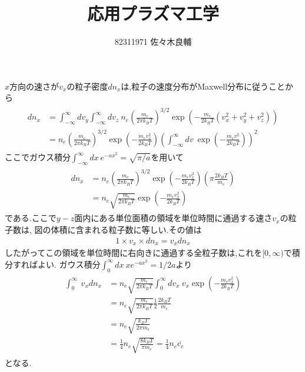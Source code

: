 \documentclass[uplatex,a4j,11pt,dvipdfmx]{jsarticle}
\begin{document}
\title{応用プラズマ工学}
\author{82311971 佐々木良輔}
\date{}
\maketitle
$x$方向の速さが$v_x$の粒子密度$dn_x$は,粒子の速度分布がMaxwell分布に従うことから
\begin{align}
  \begin{split}
    dn_x&=\int_{-\infty}^{\infty}dv_y\int_{-\infty}^{\infty}dv_z\ n_e\left(\frac{m_e}{2\pi k_BT}\right)^{3/2}\exp\left(-\frac{m_e}{2k_BT}(v_x^2+v_y^2+v_z^2)\right)\\
    &=n_e\left(\frac{m_e}{2\pi k_BT}\right)^{3/2}\exp\left(-\frac{m_ev_x^2}{2k_BT}\right)\left(\int_{-\infty}^{\infty}dv\ \exp\left(-\frac{m_ev^2}{2k_BT}\right)\right)^2
  \end{split}
\end{align}
ここでガウス積分$\int_{-\infty}^{\infty}dx\ e^{-ax^2}=\sqrt{\pi/a}$を用いて
\begin{align}
  \begin{split}
    dn_x&=n_e\left(\frac{m_e}{2\pi k_BT}\right)^{3/2}\exp\left(-\frac{m_ev_x^2}{2k_BT}\right)\left(\pi\frac{2k_BT}{m_e}\right)\\
    &=n_e\sqrt{\frac{m_e}{2\pi k_BT}}\exp\left(-\frac{m_ev_x^2}{2k_BT}\right)
  \end{split}
\end{align}
である.ここで$y-z$面内にある単位面積の領域を単位時間に通過する速さ$v_x$の粒子数は,
図の体積に含まれる粒子数に等しい.その値は
\begin{align}
  1\times v_x\times dn_x=v_xdn_x
\end{align}
したがってこの領域を単位時間に右向きに通過する全粒子数は,これを$[0,\infty)$で積分すればよい.
ガウス積分$\int_{0}^{\infty}dx\ xe^{-ax^2}=1/2a$より
\begin{align}
  \begin{split}
    \int_{0}^{\infty}\ v_xdn_x&=
    n_e\sqrt{\frac{m_e}{2\pi k_BT}}\int_{0}^{\infty}dv_x\ v_x\exp\left(-\frac{m_ev_x^2}{2k_BT}\right)\\&=
    n_e\sqrt{\frac{m_e}{2\pi k_BT}}\frac{1}{2}\frac{2k_BT}{m_e}\\
    &=n_e\sqrt{\frac{k_BT}{2\pi m_e}}\\
    &=\frac{1}{4}n_e\sqrt{\frac{8k_BT}{\pi m_e}}=\frac{1}{4}n_e\overline{c_e}
  \end{split}
\end{align}
となる.

\end{document}
